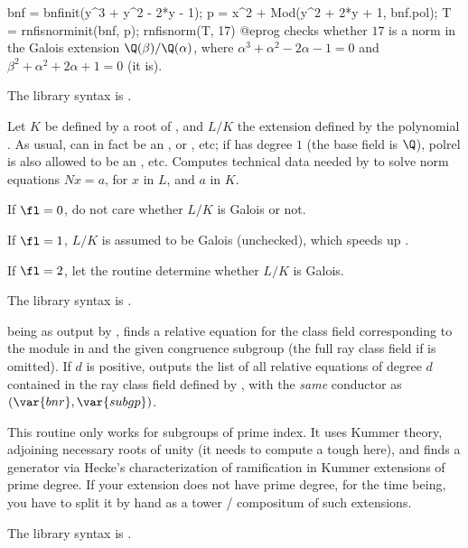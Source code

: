 \bprog
bnf = bnfinit(y^3 + y^2 - 2*y - 1);
p = x^2 + Mod(y^2 + 2*y + 1, bnf.pol);
T = rnfisnorminit(bnf, p);
rnfisnorm(T, 17)
@eprog\noindent
checks whether $17$ is a norm in the Galois extension $\Q(\beta) /
\Q(\alpha)$, where $\alpha^3 + \alpha^2 - 2\alpha - 1 = 0$ and $\beta^2 +
\alpha^2 + 2\alpha + 1 = 0$ (it is).

The library syntax is .

\label{se:rnfisnorminit}
Let $K$ be defined by a root of , and $L/K$ the extension defined
by the polynomial . As usual,  can in fact be an ,
or , etc; if  has degree $1$ (the base field is $\Q$),
polrel is also allowed to be an , etc. Computes technical data needed
by  to solve norm equations $Nx = a$, for $x$ in $L$, and $a$
in $K$.

If $\fl = 0$, do not care whether $L/K$ is Galois or not.

If $\fl = 1$, $L/K$ is assumed to be Galois (unchecked), which speeds up
.

If $\fl = 2$, let the routine determine whether $L/K$ is Galois.

The library syntax is .

\label{se:rnfkummer}
being as output by , finds a relative equation for the
class field corresponding to the module in  and the given
congruence subgroup (the full ray class field if  is omitted).
If $d$ is positive, outputs the list of all relative equations of
degree $d$ contained in the ray class field defined by , with
the \emph{same} conductor as $(\var{bnr}, \var{subgp})$.

 This routine only works for subgroups of prime index. It
uses Kummer theory, adjoining necessary roots of unity (it needs to compute a
tough  here), and finds a generator via Hecke's characterization
of ramification in Kummer extensions of prime degree. If your extension does
not have prime degree, for the time being, you have to split it by hand as a
tower / compositum of such extensions.

The library syntax is .

